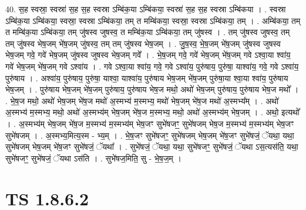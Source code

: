 \documentclass[17pt]{extarticle}
\begin{document}
40. स॒ह स्वस्रा॒ स्वस्रा॑ स॒ह स॒ह स्वस्रा ऽम्बि॑क॒या ऽम्बि॑कया॒ स्वस्रा॑ स॒ह स॒ह स्वस्रा ऽम्बि॑कया । . स्वस्रा ऽम्बि॑क॒या ऽम्बि॑कया॒ स्वस्रा॒ स्वस्रा ऽम्बि॑कया॒ तम् त मम्बि॑कया॒ स्वस्रा॒ स्वस्रा ऽम्बि॑कया॒ तम् । . अम्बि॑कया॒ तम् त मम्बि॑क॒या ऽम्बि॑कया॒ तम् जु॑षस्व जुषस्व॒ त मम्बि॑क॒या ऽम्बि॑कया॒ तम् जु॑षस्व । . तम् जु॑षस्व जुषस्व॒ तम् तम् जु॑षस्व भेष॒जम् भे॑ष॒जम् जु॑षस्व॒ तम् तम् जु॑षस्व भेष॒जम् । . जु॒ष॒स्व॒ भे॒ष॒जम् भे॑ष॒जम् जु॑षस्व जुषस्व भेष॒जम् गवे॒ गवे॑ भेष॒जम् जु॑षस्व जुषस्व भेष॒जम् गवे᳚ । . भे॒ष॒जम् गवे॒ गवे॑ भेष॒जम् भे॑ष॒जम् गवे ऽश्वा॒या श्वा॑य॒ गवे॑ भेष॒जम् भे॑ष॒जम् गवे ऽश्वा॑य । . गवे ऽश्वा॒या श्वा॑य॒ गवे॒ गवे ऽश्वा॑य॒ पुरु॑षाय॒ पुरु॑षा॒ याश्वा॑य॒ गवे॒ गवे ऽश्वा॑य॒ पुरु॑षाय । . अश्वा॑य॒ पुरु॑षाय॒ पुरु॑षा॒ याश्वा॒ याश्वा॑य॒ पुरु॑षाय भेष॒जम् भे॑ष॒जम् पुरु॑षा॒या श्वा॒या श्वा॑य॒ पुरु॑षाय भेष॒जम् । . पुरु॑षाय भेष॒जम् भे॑ष॒जम् पुरु॑षाय॒ पुरु॑षाय भेष॒ज मथो॒ अथो॑ भेष॒जम् पुरु॑षाय॒ पुरु॑षाय भेष॒ज मथो᳚ । . भे॒ष॒ज मथो॒ अथो॑ भेष॒जम् भे॑ष॒ज मथो॑ अ॒स्मभ्य॑ म॒स्मभ्य॒ मथो॑ भेष॒जम् भे॑ष॒ज मथो॑ अ॒स्मभ्य᳚म् । . अथो॑ अ॒स्मभ्य॑ म॒स्मभ्य॒ मथो॒ अथो॑ अ॒स्मभ्य॑म् भेष॒जम् भे॑ष॒ज म॒स्मभ्य॒ मथो॒ अथो॑ अ॒स्मभ्य॑म् भेष॒जम् । . अथो॒ इत्यथो᳚ । . अ॒स्मभ्य॑म् भेष॒जम् भे॑ष॒ज म॒स्मभ्य॑ म॒स्मभ्य॑म् भेष॒जꣳ सुभे॑षजꣳ॒॒ सुभे॑षजम् भेष॒ज म॒स्मभ्य॑ म॒स्मभ्य॑म् भेष॒जꣳ सुभे॑षजम् । . अ॒स्मभ्य॒मित्य॒स्म - भ्य॒म् । . भे॒ष॒जꣳ सुभे॑षजꣳ॒॒ सुभे॑षजम् भेष॒जम् भे॑ष॒जꣳ सुभे॑षजं॒ ॅयथा॒ यथा॒ सुभे॑षजम् भेष॒जम् भे॑ष॒जꣳ सुभे॑षजं॒ ॅयथा᳚ । . सुभे॑षजं॒ ॅयथा॒ यथा॒ सुभे॑षजꣳ॒॒ सुभे॑षजं॒ ॅयथा ऽस॒त्यस॑ति॒ यथा॒ सुभे॑षजꣳ॒॒ सुभे॑षजं॒ ॅयथा ऽस॑ति । . सुभे॑षज॒मिति॒ सु - भे॒ष॒ज॒म् । \newline
\pagebreak
{}
\section*{ TS 1.8.6.2 }
\end{document}
